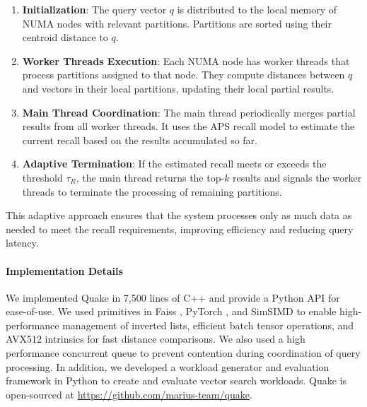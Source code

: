 \begin{enumerate}[leftmargin=*, itemsep=-.25em, topsep=0pt]
\item \textbf{Initialization}: The query vector $q$ is distributed to the local memory of NUMA nodes with relevant partitions. Partitions are sorted using their centroid distance to $q$.

\item \textbf{Worker Threads Execution}: Each NUMA node has worker threads that process partitions assigned to that node. They compute distances between $q$ and vectors in their local partitions, updating their local partial results.

\item \textbf{Main Thread Coordination}: The main thread periodically merges partial results from all worker threads. It uses the APS recall model to estimate the current recall based on the results accumulated so far.

\item \textbf{Adaptive Termination}: If the estimated recall meets or exceeds the threshold $\tau_R$, the main thread returns the top-$k$ results and signals the worker threads to terminate the processing of remaining partitions.

\end{enumerate}

This adaptive approach ensures that the system processes only as much data as needed to meet the recall requirements, improving efficiency and reducing query latency. 

\paragraph{Implementation Details}
We implemented Quake in 7,500 lines of C++ and provide a Python API for ease-of-use. We used primitives in Faiss \cite{douze2024faisslibrary}, PyTorch \cite{libtorch}, and SimSIMD \cite{simsimd} to enable high-performance management of inverted lists, efficient batch tensor operations, and AVX512 intrinsics for fast distance comparisons. We also used a high performance concurrent queue \cite{moody} to prevent contention during coordination of query processing. In addition, we developed a workload generator and evaluation framework in Python to create and evaluate vector search workloads. Quake is open-sourced at \href{https://github.com/marius-team/quake}{https://github.com/marius-team/quake}.


